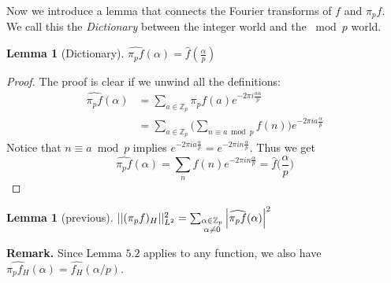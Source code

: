 \documentclass[12pt]{amsart}
\newtheorem{lemma}[theorem]{Lemma}
\newcommand{\ZZ}{\mathbb{Z}}
\begin{document}
Now we introduce a lemma that connects the Fourier transforms of $f$ and $\pi_p f$. We call this the \textit{Dictionary} between the integer world and the $\bmod p$ world. 
\begin{lemma}[Dictionary]
    $\widehat{\pi_p f} (\alpha) = \widehat{f} (\frac{\alpha}{p})$ 
\end{lemma}
\begin{proof}
    The proof is clear if we unwind all the definitions:
    \begin{align*}
        \widehat{\pi_p f}(\alpha)
        &= \sum_{a \in \ZZ_p} \pi_p f(a) e^{- 2 \pi i \frac{a \alpha}{p}} \\ 
        &= \sum_{a \in \ZZ_p} \bigg( \sum_{n \equiv a \bmod p} f(n) \bigg) e^{- 2 \pi i a \frac{\alpha}{p}}
    \end{align*}
    Notice that $n \equiv a \bmod p$ implies $e^{- 2\pi i a \frac{\alpha}{p} } = e^{- 2\pi i n \frac{\alpha}{p}}$. Thus we get 
    \begin{equation*}
        \widehat{\pi_p f} (\alpha) = \sum_{n} f(n) e^{- 2 \pi i n \frac{\alpha}{p}} = \widehat{f} \Big( \frac{\alpha}{p} \Big)
    \end{equation*}
\end{proof}
\begin{lemma}[previous]
    $||(\pi_p f)_H ||_{L^2}^2 = \sum_{\begin{subarray}{c} \alpha \in \ZZ_p \\ \alpha \neq 0 \end{subarray}} \Big| \widehat{\pi_p f}(\alpha) \Big|^2$
\end{lemma} 
\textbf{Remark.} Since Lemma $5.2$ applies to any function, we also have $\widehat{\pi_p f_H} (\alpha) = \widehat{f_H}(\alpha / p)$.
\end{document}
